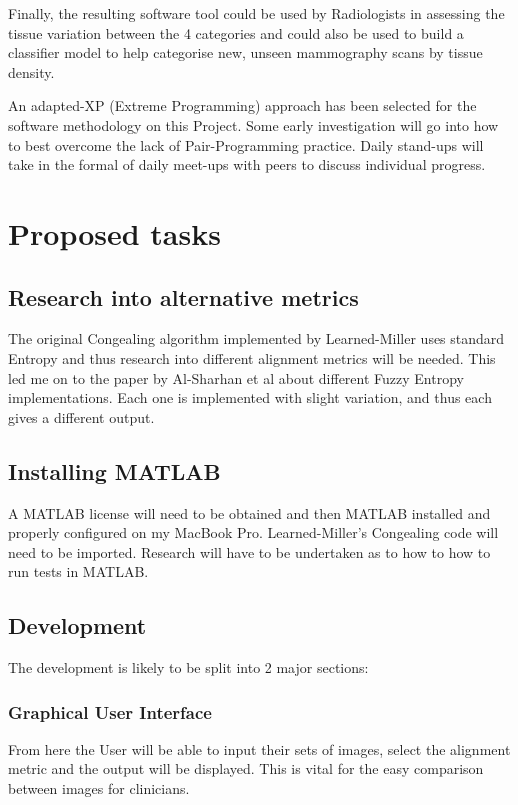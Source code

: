 \documentclass[11pt,fleqn,twoside]{article}
\begin{document}
Finally, the resulting software tool could be used by Radiologists in assessing the tissue variation between the 4 categories and could also be used to build a classifier model to help categorise new, unseen mammography scans by tissue density.

An adapted-XP (Extreme Programming) approach has been selected for the software methodology on this Project. Some early investigation will go into how to best overcome the lack of Pair-Programming practice. Daily stand-ups will take in the formal of daily meet-ups with peers to discuss individual progress. \par

\section{Proposed tasks}

\subsection{Research into alternative metrics}
\label{ssec:alt-met}
The original Congealing algorithm implemented by Learned-Miller uses standard Entropy and thus research into different alignment metrics will be needed. This led me on to the paper by Al-Sharhan et al \cite{fuzzy-entropy} about different Fuzzy Entropy implementations. Each one is implemented with slight variation, and thus each gives a different output. \par

\subsection{Installing MATLAB}
A MATLAB license will need to be obtained and then MATLAB installed and properly configured on my MacBook Pro. Learned-Miller's Congealing code will need to be imported. Research will have to be undertaken as to how to how to run tests in MATLAB.

\subsection{Development}
The development is likely to be split into 2 major sections:
  \subsubsection{Graphical User Interface}
  From here the User will be able to input their sets of images, select the alignment metric and the output will be displayed. This is vital for the easy comparison between images for clinicians.
\end{document}
